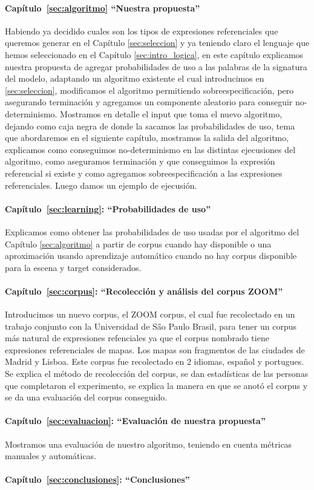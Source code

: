 \paragraph{Cap\'itulo~\ref{sec:algoritmo} ``Nuestra propuesta''} Habiendo ya decidido cuales son los tipos de expresiones referenciales que queremos generar en el Cap\'itulo \ref{sec:seleccion} y ya teniendo
claro el lenguaje \EL que hemos seleccionado en el Cap\'itulo \ref{sec:intro_logica}, en este cap\'itulo 
explicamos nuestra propuesta de agregar probabilidades de uso a las palabras de la signatura del modelo, adaptando un algoritmo existente 
\cite{arec2:2008:Areces} el cual introducimos en \ref{sec:seleccion}, modificamos el algoritmo permitiendo sobreespecificaci\'on, 
pero asegurando terminaci\'on y agregamos un componente aleatorio para conseguir no-determinismo. Mostramos en detalle el input que toma el
 nuevo algoritmo, dejando como caja negra de donde la sacamos las probabilidades de uso, tema que abordaremos en el siguiente cap\'itulo, 
mostramos la salida del algoritmo, explicamos como conseguimos no-determinismo en las distintas ejecusiones del algoritmo, como aseguramos 
terminaci\'on y que conseguimos la expresi\'on referencial si existe y como agregamos sobreespecificaci\'on a las expresiones referenciales. 
Luego damos un ejemplo de ejecusi\'on. 


\paragraph{Cap\'itulo~\ref{sec:learning}: ``Probabilidades de uso''}
Explicamos como obtener las probabilidades de uso usadas por el algoritmo del Cap\'itulo \ref{sec:algoritmo} a partir de corpus cuando hay disponible o una aproximaci\'on usando aprendizaje autom\'atico cuando no hay corpus disponible para la escena y target considerados. 


\paragraph{Cap\'itulo~\ref{sec:corpus}: ``Recolecci\'on y an\'alisis del corpus ZOOM''}
Introducimos un nuevo corpus, el ZOOM corpus, el cual fue recolectado en un trabajo conjunto con la Universidad de S\H ao Paulo Brasil, para tener un corpus m\'as natural de expresiones refenciales ya que el corpus nombrado tiene expresiones referenciales de mapas. Los mapas son fragmentos de las ciudades de Madrid y Lisboa. Este corpus fue recolectado en 2 idiomas, espa\~nol y portugues. Se explica el m\'etodo de recolecci\'on del corpus, se dan estad\'isticas de las personas que completaron el experimento, se explica la manera en que se anot\'o el corpus y se da una evaluaci\'on del corpus conseguido.

\paragraph{Cap\'itulo~\ref{sec:evaluacion}: ``Evaluaci\'on de nuestra propuesta''}
Mostramos una evaluaci\'on de nuestro algoritmo, teniendo en cuenta m\'etricas manuales y autom\'aticas. 

\paragraph{Cap\'itulo~\ref{sec:conclusiones}: ``Conclusiones''}

